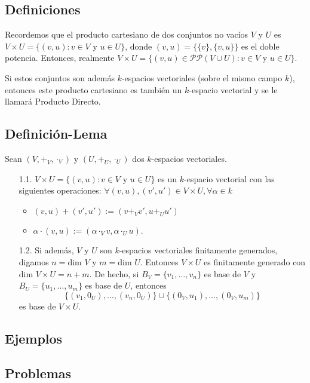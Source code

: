 
\subsection*{Definiciones}
Recordemos que el producto cartesiano de dos conjuntos no vacíos \( V \) y \( U \) es \( V \times U = \{ (v, u) : v \in V \text{ y } u \in U \} \), donde \( (v, u) = \{ \{v\}, \{v, u\} \} \) es el doble potencia. Entonces, realmente \( V \times U = \{ (v, u) \in \mathcal{P}\mathcal{P}(V \cup U) : v \in V \text{ y } u \in U \} \).

Si estos conjuntos son además \( k \)-espacios vectoriales (sobre el mismo campo \( k \)), entonces este producto cartesiano es también un \( k \)-espacio vectorial y se le llamará Producto Directo.

\subsection*{Definición-Lema}
Sean \( (V, +_V, \cdot_V) \) y \( (U, +_U, \cdot_U) \) dos \( k \)-espacios vectoriales.
\begin{enumerate}
    \item[1.1.] \( V \times U = \{ (v, u) : v \in V \text{ y } u \in U \} \) es un \( k \)-espacio vectorial con las siguientes operaciones: \( \forall (v, u), (v', u') \in V \times U, \forall \alpha \in k \)
    \begin{itemize}
        \item \( (v, u) + (v', u') := (v +_V v', u +_U u') \)
        \item \( \alpha \cdot (v, u) := (\alpha \cdot_V v, \alpha \cdot_U u) \).
    \end{itemize}
    \item[1.2.] Si además, \( V \) y \( U \) son \( k \)-espacios vectoriales finitamente generados, digamos \( n = \text{dim } V \) y \( m = \text{dim } U \). Entonces \( V \times U \) es finitamente generado con \( \text{dim } V \times U = n + m \).
    De hecho, si \( B_V = \{ v_1, \ldots, v_n \} \) es base de \( V \) y \( B_U = \{ u_1, \ldots, u_m \} \) es base de \( U \), entonces
    \[
    \{ (v_1, 0_U), \ldots, (v_n, 0_U) \} \cup \{ (0_V, u_1), \ldots, (0_V, u_m) \}
    \]
    es base de \( V \times U \).
\end{enumerate}

\subsection*{Ejemplos}

\subsection*{Problemas}